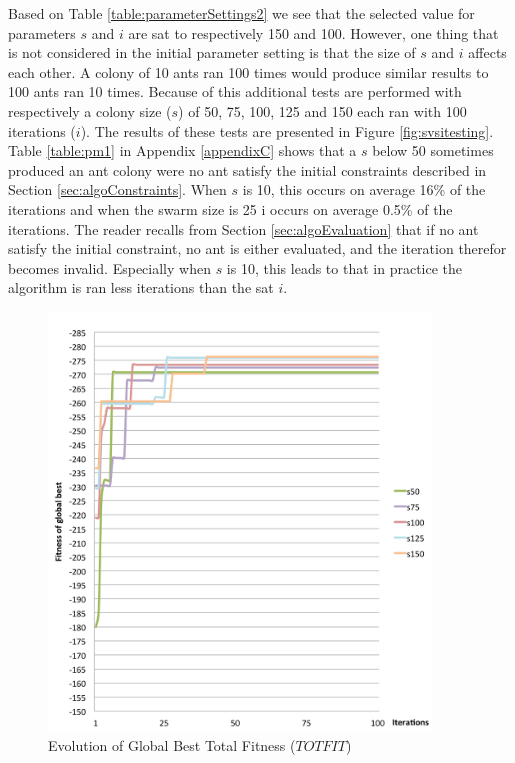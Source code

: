 Based on Table \vref{table:parameterSettings2} we see that the selected value for parameters $s$ and $i$ are sat to respectively 150 and 100. However, one thing that is not considered in the initial parameter setting is that the size of $s$ and $i$ affects each other. A colony of 10 ants ran 100 times would produce similar results to 100 ants ran 10 times. Because of this additional tests are performed with respectively a colony size ($s$) of 50, 75, 100, 125 and 150 each ran with 100 iterations ($i$). The results of these tests are presented in Figure \vref{fig:svsitesting}. Table \vref{table:pm1} in Appendix \ref{appendixC} shows that a $s$ below 50 sometimes produced an ant colony were no ant satisfy the initial constraints described in Section \vref{sec:algoConstraints}. When $s$ is 10, this occurs on average 16\% of the iterations and when the swarm size is 25 i occurs on average 0.5\% of the iterations. The reader recalls from Section \vref{sec:algoEvaluation} that if no ant satisfy the initial constraint, no ant is either evaluated, and the iteration therefor becomes invalid. Especially when $s$ is 10, this leads to that in practice the algorithm is ran less iterations than the sat $i$. 

\begin{figure}[H]
\begin{center}
  \includegraphics[width=4in]{assets/svsitest.png}
  \end{center}
  \caption{Evolution of Global Best Total Fitness ($TOTFIT$)}
  \label{fig:svsitesting} 
\end{figure}

